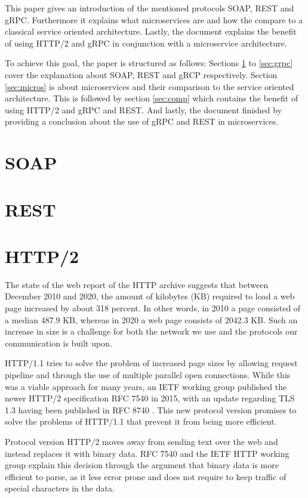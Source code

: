 \documentclass[conference]{IEEEtran}
\begin{document}
This paper gives an introduction of the mentioned protocols SOAP, REST and gRPC. Furthermore it explains what microservices are and how the compare to a classical service oriented architecture. Lastly, the document explains the benefit of using HTTP/2 and gRPC in conjunction with a microservice architecture.

To achieve this goal, the paper is structured as follows: Sections \ref{sec:soap} to \ref{sec:grpc} cover the explanation about SOAP, REST and gRCP respectively. Section \ref{sec:micros} is about microservices and their comparison to the service oriented architecture. This is followed by section \ref{sec:comp} which contains the benefit of using HTTP/2 and gRPC and REST. And lastly, the document finished by providing a conclusion about the use of gRPC and REST in microservices.

\section{SOAP}
\label{sec:soap}

\section{REST}

\section{HTTP/2}

The state of the web report of the HTTP archive \cite{httpArchive} suggests that between December 2010 and 2020, the amount of kilobytes (KB) required to load a web page increased by about 318 percent. In other words, in 2010 a page consisted of a median 487.9 KB, whereas in 2020 a web page consists of 2042.3 KB. Such an increase in size is a challenge for both the network we use and the protocols our communication is built upon.

HTTP/1.1 tries to solve the problem of increased page sizes by allowing request pipeline and through the use of multiple parallel open connections. While this was a viable approach for many years, an IETF working group published the newer HTTP/2 specification RFC 7540 \cite{rfc7540} in 2015, with an update regarding TLS 1.3 having been published in RFC 8740 \cite{rfc8740}. This new protocol version promises to solve the problems of HTTP/1.1 that prevent it from being more efficient.

Protocol version HTTP/2 moves away from sending text over the web and instead replaces it with binary data. RFC 7540 \cite{rfc7540} and the IETF HTTP working group \cite{httpwgHTTP2} explain this decision through the argument that binary data is more efficient to parse, as it less error prone and does not require to keep traffic of special characters in the data.
\end{document}
